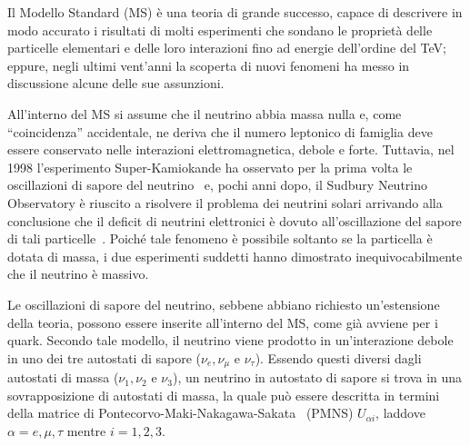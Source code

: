 Il Modello Standard (MS) è una teoria di grande successo, capace di descrivere in modo accurato i risultati di molti esperimenti che sondano le proprietà delle particelle elementari e delle loro interazioni fino ad energie dell'ordine del TeV; eppure, negli ultimi vent'anni la scoperta di nuovi fenomeni ha messo in discussione alcune delle sue assunzioni.

All'interno del MS si assume che il neutrino abbia massa nulla e, come ``coincidenza'' accidentale, ne deriva che il numero leptonico di famiglia deve essere conservato nelle interazioni elettromagnetica, debole e forte.
Tuttavia, nel 1998 l'esperimento Super-Kamiokande ha osservato per la prima volta le oscillazioni di sapore del neutrino~\cite{fukuda:prl98} e, pochi anni dopo, il Sudbury Neutrino Observatory è riuscito a risolvere il problema dei neutrini solari arrivando alla conclusione che il deficit di neutrini elettronici è dovuto all'oscillazione del sapore di tali particelle~\cite{ahmad:prl01}.
Poiché tale fenomeno è possibile soltanto se la particella è dotata di massa, i due esperimenti suddetti hanno dimostrato inequivocabilmente che il neutrino è massivo.

%
%
Le oscillazioni di sapore del neutrino, sebbene abbiano richiesto un'estensione della teoria, possono essere inserite all'interno del MS, come già avviene per i quark.
%
%
Secondo tale modello, il neutrino viene prodotto in un'interazione debole in uno dei tre autostati di sapore ($\nu_e, \nu_{\mu} \mbox{ e }  \nu_{\tau}$).
Essendo questi diversi dagli autostati di massa ($\nu_1, \nu_{2} \mbox{ e }  \nu_{3}$), un neutrino in autostato di sapore si trova in una sovrapposizione di autostati di massa,
la quale può essere descritta in termini della matrice di Pontecorvo-Maki-Nakagawa-Sakata~\cite{maki:ptp62} (PMNS) $U_{\alpha i}$, laddove $\alpha = e, \mu, \tau $ mentre $ i = 1, 2, 3 $.



